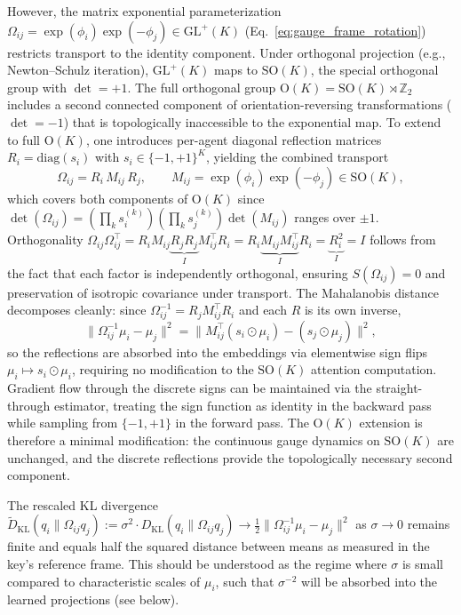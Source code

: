 \documentclass[twoside,11pt]{article}
\begin{document}
However, the matrix exponential parameterization $\Omega_{ij} = \exp(\phi_i)\exp(-\phi_j) \in \mathrm{GL}^+(K)$ (Eq.~\ref{eq:gauge_frame_rotation}) restricts transport to the identity component.  Under orthogonal projection (e.g., Newton--Schulz iteration), $\mathrm{GL}^+(K)$ maps to $\mathrm{SO}(K)$, the special orthogonal group with $\det = +1$.  The full orthogonal group $\mathrm{O}(K) = \mathrm{SO}(K) \rtimes \mathbb{Z}_2$ includes a second connected component of orientation-reversing transformations ($\det = -1$) that is topologically inaccessible to the exponential map.  To extend to full $\mathrm{O}(K)$, one introduces per-agent diagonal reflection matrices $R_i = \mathrm{diag}(s_i)$ with $s_i \in \{-1,+1\}^K$, yielding the combined transport
%
\begin{equation}
\Omega_{ij} = R_i \, M_{ij} \, R_j, \qquad M_{ij} = \exp(\phi_i)\exp(-\phi_j) \in \mathrm{SO}(K),
\label{eq:ok_transport}
\end{equation}
%
which covers both components of $\mathrm{O}(K)$ since $\det(\Omega_{ij}) = (\prod_k s_i^{(k)})(\prod_k s_j^{(k)})\det(M_{ij})$ ranges over $\pm 1$.  Orthogonality $\Omega_{ij}\Omega_{ij}^\top = R_i M_{ij} \underbrace{R_j R_j}_{I} M_{ij}^\top R_i = R_i \underbrace{M_{ij}M_{ij}^\top}_{I} R_i = \underbrace{R_i^2}_{I} = I$ follows from the fact that each factor is independently orthogonal, ensuring $S(\Omega_{ij}) = 0$ and preservation of isotropic covariance under transport.  The Mahalanobis distance decomposes cleanly: since $\Omega_{ij}^{-1} = R_j M_{ij}^\top R_i$ and each $R$ is its own inverse,
%
\begin{equation}
\|\Omega_{ij}^{-1}\mu_i - \mu_j\|^2 = \|M_{ij}^\top(s_i \odot \mu_i) - (s_j \odot \mu_j)\|^2,
\label{eq:ok_mahalanobis}
\end{equation}
%
so the reflections are absorbed into the embeddings via elementwise sign flips $\mu_i \mapsto s_i \odot \mu_i$, requiring no modification to the $\mathrm{SO}(K)$ attention computation.  Gradient flow through the discrete signs can be maintained via the straight-through estimator, treating the sign function as identity in the backward pass while sampling from $\{-1,+1\}$ in the forward pass.  The $\mathrm{O}(K)$ extension is therefore a minimal modification: the continuous gauge dynamics on $\mathrm{SO}(K)$ are unchanged, and the discrete reflections provide the topologically necessary second component.

The rescaled KL divergence $\widetilde{D}_{\mathrm{KL}}(q_i \| \Omega_{ij}q_j) := \sigma^2 \cdot D_{\mathrm{KL}}(q_i \| \Omega_{ij}q_j) \to \frac{1}{2}\|\Omega_{ij}^{-1}\mu_i - \mu_j\|^2$ as $\sigma \to 0$ remains finite and equals half the squared distance between means as measured in the key's reference frame. This should be understood as the regime where $\sigma$ is small compared to characteristic scales of $\mu_i$, such that $\sigma^{-2}$ will be absorbed into the learned projections (see below).
\end{document}
